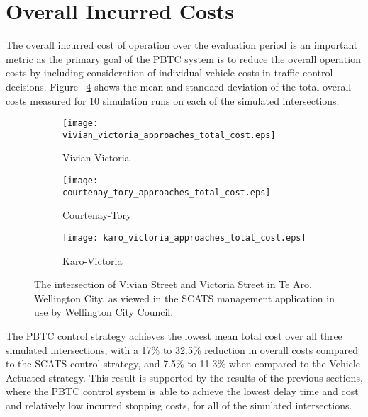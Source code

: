 \section{Overall Incurred Costs}

The overall incurred cost of operation over the evaluation period is an important metric as the primary goal of the PBTC system is to reduce the overall operation costs by including consideration of individual vehicle costs in traffic control  decisions. Figure ~\ref{eval:total_cost} shows the mean and standard deviation of the total overall costs measured for 10 simulation runs on each of the simulated intersections. 

\begin{figure}
\centering
\begin{subfigure}{.5\textwidth}
  \centering
  \texttt{[image: vivian\_victoria\_approaches\_total\_cost.eps]}
  \caption{Vivian-Victoria}
  \label{total_cost:sub1}
\end{subfigure}%
\begin{subfigure}{.5\textwidth}
  \centering
  \texttt{[image: courtenay\_tory\_approaches\_total\_cost.eps]}
  \caption{Courtenay-Tory}
  \label{total_cost:sub2}
\end{subfigure}

\vspace{1cm}

\begin{subfigure}{.5\textwidth}
  \centering
  \texttt{[image: karo\_victoria\_approaches\_total\_cost.eps]}
  \caption{Karo-Victoria}
  \label{total_cost:sub3}
\end{subfigure}%
\caption{The intersection of Vivian Street and Victoria Street in Te Aro, Wellington City, as viewed in the SCATS management application in use by Wellington City Council. }
\label{eval:total_cost}
\end{figure}

The PBTC control strategy achieves the lowest mean total cost over all three simulated intersections, with a 17\% to 32.5\% reduction in overall costs compared to the SCATS control strategy, and 7.5\% to 11.3\% when compared to the Vehicle Actuated strategy. This result is supported by the results of the previous sections, where the PBTC control system is able to achieve the lowest delay time and cost and relatively low incurred stopping costs, for all of the simulated intersections. 

